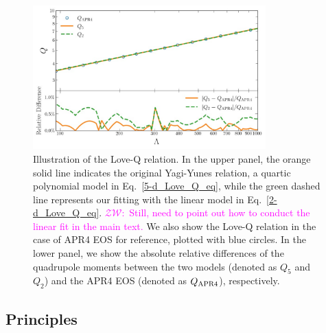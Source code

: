 \documentclass[a4paper,11pt]{article}
\newcommand{\ZW}[1]{\textcolor{magenta}{$\mathcal{ZW}$:~#1}}
\begin{document}
\begin{figure}[tbp]
\centering
\includegraphics[width=0.8\textwidth]{2d-5d difference.pdf}%
\caption{Illustration of the Love-Q relation. In the upper panel, the orange
solid line indicates the original Yagi-Yunes relation, a quartic polynomial model
 in
Eq.~\eqref{5-d_Love_Q_eq}, while the green dashed line represents our fitting
with the linear model in Eq.~\eqref{2-d_Love_Q_eq}. \ZW{Still, need to point out
how to conduct the linear fit in the main text.} We also show the Love-Q
relation in the case of APR4 EOS for reference, plotted with blue circles.
In the lower panel, we show the absolute relative differences of the quadrupole
moments
between the two
models (denoted as $Q_5$ and $Q_2$) and the APR4 EOS (denoted as $Q_{\rm
APR4}$), respectively.}\label{relative_difference}
\end{figure}

\subsection{Principles}
\label{subsec:framework_principles}
\end{document}
